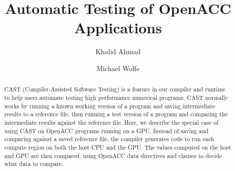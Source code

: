 \documentclass{llncs}
\begin{document}
\title{Automatic Testing of OpenACC Applications}
%
%
\author{Khalid Ahmad \and Michael Wolfe}
%
%
%

\maketitle              %

\begin{abstract}
CAST (Compiler-Assisted Software Testing) is a feature in our compiler and runtime to help users automate testing high performance numerical programs.
CAST normally works by running a known working version of a program and saving intermediate results to a reference file, then running a test version of a program and comparing the intermediate results against the reference file.
Here, we describe the special case of using CAST on OpenACC programs running on a GPU.
Instead of saving and comparing against a saved reference file, the compiler generates code to run each compute region on both the host CPU and the GPU.
The values computed on the host and GPU are then compared, using OpenACC data directives and clauses to decide what data to compare.
\end{abstract}
%









%


\end{document}
